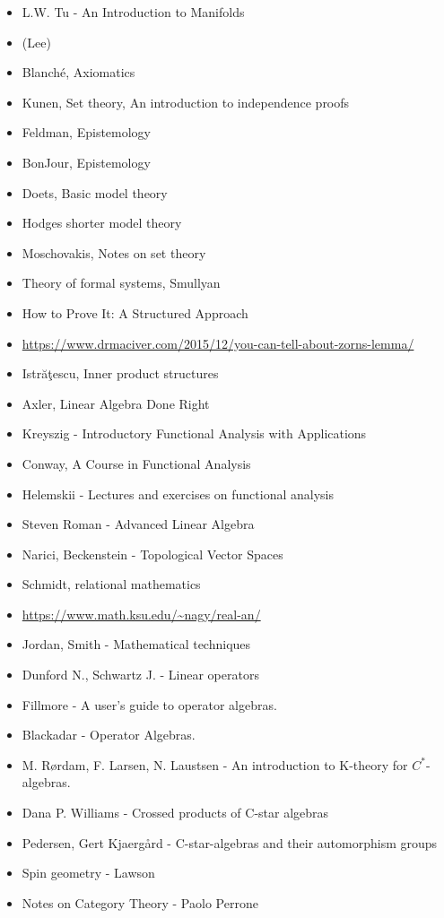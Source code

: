 \documentclass{report}
\begin{document}
\begin{itemize}
\item L.W. Tu - An Introduction to Manifolds
\item (Lee)
\item Blanché, Axiomatics
\item Kunen, Set theory, An introduction to independence proofs
\item Feldman, Epistemology
\item BonJour, Epistemology
\item Doets, Basic model theory
\item Hodges shorter model theory
\item Moschovakis, Notes on set theory
\item Theory of formal systems, Smullyan
\item How  to  Prove  It:  A  Structured  Approach
\item \url{https://www.drmaciver.com/2015/12/you-can-tell-about-zorns-lemma/}
\item Istrăţescu, Inner product structures
\item Axler, Linear Algebra Done Right
\item Kreyszig - Introductory Functional Analysis with Applications
\item Conway, A Course in Functional Analysis
\item Helemskii - Lectures and exercises on functional analysis
\item Steven Roman - Advanced Linear Algebra
\item Narici, Beckenstein - Topological Vector Spaces
\item Schmidt, relational mathematics
\item \url{https://www.math.ksu.edu/~nagy/real-an/}
\item Jordan, Smith - Mathematical techniques
\item Dunford N., Schwartz J. - Linear operators
\item Fillmore - A user's guide to operator algebras.
\item Blackadar - Operator Algebras.
\item M.  Rørdam,  F.  Larsen,  N.  Laustsen - An  introduction  to  K-theory  for $C^*$-algebras.
\item Dana P. Williams - Crossed products of C-star algebras
\item Pedersen, Gert Kjaergård - C-star-algebras and their automorphism groups
\item Spin geometry - Lawson
\item Notes on Category Theory - Paolo Perrone

\end{itemize}
\end{document}
